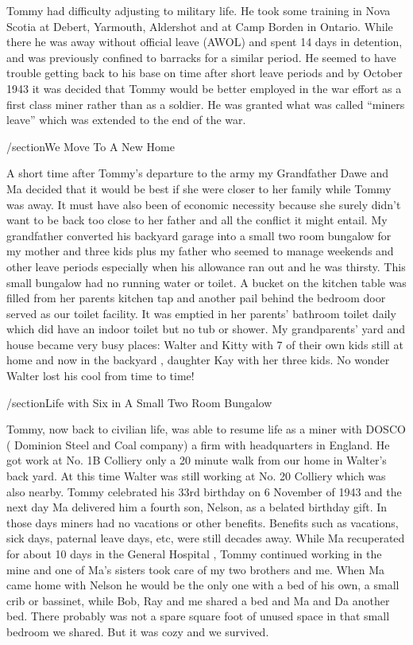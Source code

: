 Tommy had difficulty adjusting to military life. He took some training in Nova Scotia at Debert, Yarmouth, Aldershot and at Camp Borden in Ontario. While there he was away without official leave (AWOL) and spent 14 days in detention, and was previously confined to barracks for a similar period. He seemed to have trouble getting back to his base on time after short leave periods and by October 1943 it was decided that Tommy would be better employed in the war effort as a first class miner rather than as a soldier. He was granted what was called “miners leave” which was extended to the end of the war.

/section{We Move To A New Home}

A short time after Tommy's departure to the army my Grandfather Dawe and Ma decided that it would be best if she were closer to her family while Tommy was away. It must have also been of economic necessity because she surely didn't want to be back too close to her father and all the conflict it might entail. My grandfather converted his backyard garage into a small two room bungalow for my mother and three kids plus my father who seemed to manage weekends and other leave periods especially when his allowance ran out and he was thirsty. This small bungalow had no running water or toilet. A bucket on the kitchen table was filled from her parents kitchen tap and another pail behind the bedroom door served as our toilet facility. It was emptied in her parents' bathroom toilet daily which did have an indoor toilet but no tub or shower. My grandparents' yard and house became very busy places: Walter and Kitty with 7 of their own kids still at home and now in the backyard , daughter Kay with her three kids. No wonder Walter lost his cool from time to time!

/section{Life with Six in A Small Two Room Bungalow}

Tommy, now back to civilian life, was able to resume life as a miner with DOSCO ( Dominion Steel and Coal company) a firm with headquarters in England. He got work at No. 1B Colliery only a 20 minute walk from our home in Walter's back yard. At this time Walter was still working at No. 20 Colliery which was also nearby. Tommy celebrated his 33rd birthday on 6 November of 1943 and the next day Ma delivered him a fourth son, Nelson, as a belated birthday gift. In those days miners had no vacations or other benefits. Benefits such as vacations, sick days, paternal leave days, etc, were still decades away. While Ma recuperated for about 10 days in the General Hospital , Tommy continued working in the mine and one of Ma's sisters took care of my two brothers and me. When Ma came home with Nelson he would be the only one with a bed of his own, a small crib or bassinet, while Bob, Ray and me shared a bed and Ma and Da another bed. There probably was not a spare square foot of unused space in that small bedroom we shared. But it was cozy and we survived.

